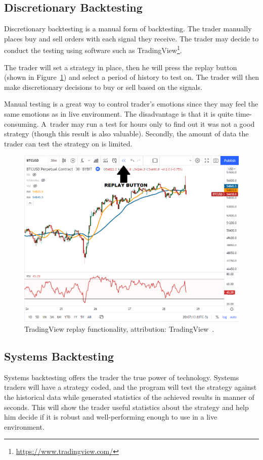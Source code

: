 \subsection*{Discretionary Backtesting}
Discretionary backtesting is a manual form of backtesting. The trader manually places buy and sell orders with each signal they receive. The trader may decide to conduct the testing using software such as TradingView\footnote{\url{https://www.tradingview.com/}}.

The trader will set a strategy in place, then he will press the replay button (shown in Figure~\ref{tradingview-figure}) and select a period of history to test on. The trader will then make discretionary decisions to buy or sell based on the signals.

Manual testing is a great way to control trader's emotions since they may feel the same emotions as in live environment. The disadvantage is that it is quite time-consuming. A~trader may run a test for hours only to find out it was not a good strategy (though this result is also valuable). Secondly, the amount of data the trader can test the strategy on is limited.

\begin{figure}[!hbt]
    \centering
    \includegraphics[width=\columnwidth]{figures/tradingview-replay.png}
    \caption{TradingView replay functionality, attribution: TradingView~\cite{backtesting-crypto-trading-strategies}.}
    \label{tradingview-figure}
\end{figure}

\subsection*{Systems Backtesting}
Systems backtesting offers the trader the true power of technology. Systems traders will have a strategy coded, and the program will test the strategy against the historical data while generated statistics of the achieved results in manner of seconds. This will show the trader useful statistics about the strategy and help him decide if it is robust and well-performing enough to use in a live environment.

